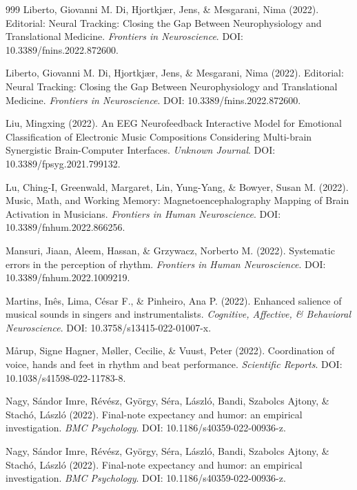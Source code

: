 \documentclass[9pt,onecolumn]{article}
\begin{document}
\begin{thebibliography}{999}
Liberto, Giovanni M. Di, Hjortkjær, Jens, \& Mesgarani, Nima (2022). Editorial: Neural Tracking: Closing the Gap Between Neurophysiology and Translational Medicine. \textit{Frontiers in Neuroscience}. DOI: 10.3389/fnins.2022.872600.

Liberto, Giovanni M. Di, Hjortkjær, Jens, \& Mesgarani, Nima (2022). Editorial: Neural Tracking: Closing the Gap Between Neurophysiology and Translational Medicine. \textit{Frontiers in Neuroscience}. DOI: 10.3389/fnins.2022.872600.

Liu, Mingxing (2022). An EEG Neurofeedback Interactive Model for Emotional Classification of Electronic Music Compositions Considering Multi-brain Synergistic Brain-Computer Interfaces. \textit{Unknown Journal}. DOI: 10.3389/fpsyg.2021.799132.

Lu, Ching-I, Greenwald, Margaret, Lin, Yung-Yang, \& Bowyer, Susan M. (2022). Music, Math, and Working Memory: Magnetoencephalography Mapping of Brain Activation in Musicians. \textit{Frontiers in Human Neuroscience}. DOI: 10.3389/fnhum.2022.866256.

Mansuri, Jiaan, Aleem, Hassan, \& Grzywacz, Norberto M. (2022). Systematic errors in the perception of rhythm. \textit{Frontiers in Human Neuroscience}. DOI: 10.3389/fnhum.2022.1009219.

Martins, Inês, Lima, César F., \& Pinheiro, Ana P. (2022). Enhanced salience of musical sounds in singers and instrumentalists. \textit{Cognitive, Affective, \& Behavioral Neuroscience}. DOI: 10.3758/s13415-022-01007-x.

Mårup, Signe Hagner, Møller, Cecilie, \& Vuust, Peter (2022). Coordination of voice, hands and feet in rhythm and beat performance. \textit{Scientific Reports}. DOI: 10.1038/s41598-022-11783-8.

Nagy, Sándor Imre, Révész, György, Séra, László, Bandi, Szabolcs Ajtony, \& Stachó, László (2022). Final-note expectancy and humor: an empirical investigation. \textit{BMC Psychology}. DOI: 10.1186/s40359-022-00936-z.

Nagy, Sándor Imre, Révész, György, Séra, László, Bandi, Szabolcs Ajtony, \& Stachó, László (2022). Final-note expectancy and humor: an empirical investigation. \textit{BMC Psychology}. DOI: 10.1186/s40359-022-00936-z.


\end{thebibliography}
\end{document}

